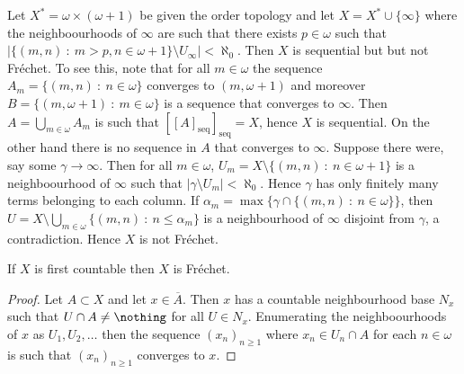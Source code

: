 \documentclass{article}
\newcommand{\seqcl}[1]{{[#1]_{\text{seq}}}}
\begin{document}
 
\begin{exam}
    Let \(X^{\ast} = \omega \times (\omega + 1)\) be given the order topology and let \(X =  X^{\ast} \cup \{\infty\}\) where the neighboourhoods  of \(\infty\) are such that there exists \(p \in \omega\) such that \(|\{(m, n) \: : \: m > p, n \in \omega + 1\} \setminus U_{\infty}| < \aleph_0\). Then \(X\) is sequential but but not Fréchet. To see this, note that for all \(m \in \omega\) the sequence \(A_m = \{(m, n) \: : \: n \in \omega\}\) converges to \((m, \omega + 1)\) and moreover \(B = \{(m, \omega + 1) \: : \: m \in \omega\}\) is a sequence that converges to \(\infty\). Then \(A = \bigcup_{m \in \omega} A_m\) is such that \(\seqcl{\seqcl{A}} = X\), hence \(X\) is sequential. On the other hand there is no sequence in \(A\) that converges to \(\infty\). Suppose there were, say some \(\gamma \to \infty\). Then for all \(m \in \omega\), \(U_m = X \setminus \{(m, n)\: : \: n \in \omega + 1\}\) is a neighboourhood of \(\infty\) such that \(|\gamma \setminus U_m| < \aleph_0\). Hence \(\gamma\) has only finitely many terms belonging to each column. If \(\alpha_m = \max\{\gamma \cap \{(m, n) \: : \: n \in \omega\}\}\), then \(U = X \setminus \bigcup_{m \in \omega} \{(m ,n )\: : \:  n \leq \alpha_m\}\) is a neighbourhood of \(\infty\) disjoint from \(\gamma\), a contradiction. Hence \(X\) is not Fréchet. 
\end{exam} 
\begin{prop}
    If \(X\) is first countable then \(X\) is Fréchet.
\end{prop}
\begin{proof}
    Let \(A \subset X\) and let \(x \in \overline{A}\). Then \(x\) has a countable neighbourhood base \(N_x\) such that \(U \cap A \neq \nothing\) for all \(U \in N_x\). Enumerating the neighboourhoods of \(x\) as \(U_1, U_2, \dots\) then the sequence \((x_n)_{n \ge 1}\) where \(x_n \in U_n \cap A\) for each \(n \in \omega\) is such that \((x_n)_{n \ge 1}\) converges to \(x\).
\end{proof}
\end{document}
